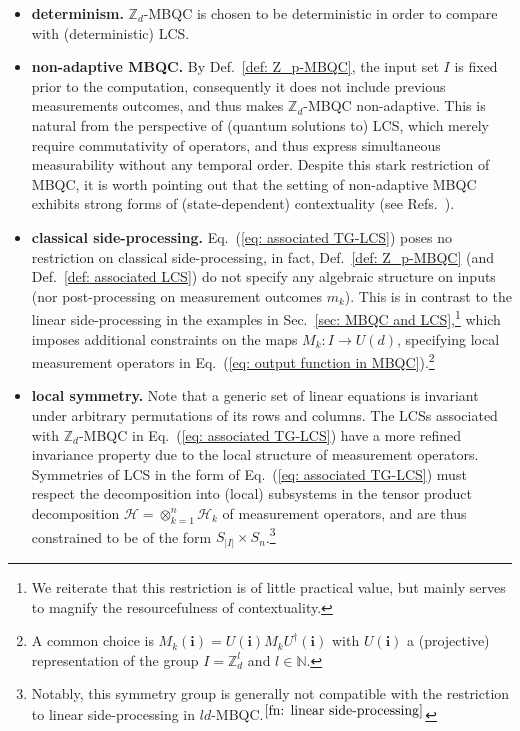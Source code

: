 \documentclass[aps,pra,letterpaper,onrcolumn,nofootinbib,notitlepage,longbibliography]{revtex4-1}
\newcommand{\ra}{\ensuremath{\rightarrow}}
\newcommand{\zz}{\mathbb Z}
\newcommand{\bi}{\mathbf{i}}
\newcommand\mc[1]{\mathcal{#1}}
\newcommand{\cH}{\mc{H}}
\begin{document}
\begin{itemize}    
    \item \textbf{determinism.} $\zz_d$-MBQC is chosen to be deterministic in order to compare with (deterministic) LCS.

    \item \textbf{non-adaptive MBQC.} By Def.~\ref{def: Z_p-MBQC}, the input set $I$ is fixed prior to the computation, consequently it does not include previous measurements outcomes, and thus makes $\zz_d$-MBQC non-adaptive. This is natural from the perspective of (quantum solutions to) LCS, which merely require commutativity of operators, and thus express simultaneous measurability without any temporal order. Despite this stark restriction of MBQC, it is worth pointing out that the setting of non-adaptive MBQC exhibits strong forms of (state-dependent) contextuality (see  Refs.~\cite{HobanCampbell2011,Raussendorf2016,FrembsRobertsBartlett2018,FrembsRobertsCampbellBartlett2022}).

    \item \textbf{classical side-processing.} Eq.~(\ref{eq: associated TG-LCS}) poses no restriction on classical side-processing, in fact, Def.~\ref{def: Z_p-MBQC} (and Def.~\ref{def: associated LCS}) do not specify any algebraic structure on inputs (nor post-processing on measurement outcomes $m_k$). This is in contrast to the linear side-processing in the examples in Sec.~\ref{sec: MBQC and LCS},\footnote{We reiterate that this restriction is of little practical value, but mainly serves to magnify the resourcefulness of contextuality.\label{fn: linear side-processing}} which imposes additional constraints on the maps $M_k:I\ra U(d)$, specifying local measurement operators in Eq.~(\ref{eq: output function in MBQC}).\footnote{A common choice is $M_k(\bi)=U(\bi)M_kU^\dagger(\bi)$ \cite{Raussendorf2016,FrembsRobertsBartlett2018,FrembsRobertsCampbellBartlett2022} with $U(\bi)$ a (projective) representation of the group $I=\zz^l_d$ and $l\in\mathbb{N}$.}

    \item \textbf{local symmetry.} Note that a generic set of linear equations is invariant under arbitrary permutations of its rows and columns. The LCSs associated with $\zz_d$-MBQC in Eq.~(\ref{eq: associated TG-LCS}) have a more refined invariance property due to the local structure of measurement operators. Symmetries of LCS in the form of Eq.~(\ref{eq: associated TG-LCS}) must respect the decomposition into (local) subsystems in the tensor product decomposition $\cH=\otimes_{k=1}^n\cH_k$ of measurement operators, and are thus constrained to be of the form $S_{|I|}\times S_n$.\footnote{Notably, this symmetry group is generally not compatible with the restriction to linear side-processing in $ld$-MBQC.$^{\ref{fn: linear side-processing}}$}
\end{itemize}
\end{document}
